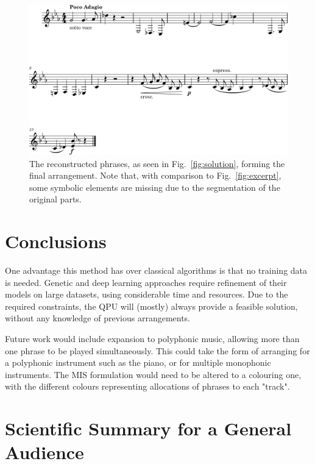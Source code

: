 \documentclass[aps,pra,10pt,twocolumn]{revtex4-2}
\begin{document}
\begin{figure}[h]
    \centering
    \includegraphics[width=\linewidth]{../Trials/1_arrangement.png}
    \caption{The reconstructed phrases, as seen in Fig.\ \ref{fig:solution}, forming the final arrangement. Note that, with comparison to Fig.\ \ref{fig:excerpt}, some symbolic elements are missing due to the segmentation of the original parts.}
    \label{fig:arrangement}
\end{figure}

\section{Conclusions}

One advantage this method has over classical algorithms is that no training data is needed. Genetic and deep learning approaches require refinement of their models on large datasets, using considerable time and resources. Due to the required constraints, the QPU will (mostly) always provide a feasible solution, without any knowledge of previous arrangements.

Future work would include expansion to polyphonic music, allowing more than one phrase to be played simultaneously. This could take the form of arranging for a polyphonic instrument such as the piano, or for multiple monophonic instruments. The MIS formulation would need to be altered to a colouring one, with the different colours representing allocations of phrases to each "track".

\nocite{*}


\clearpage

\onecolumngrid %

\section*{Scientific Summary for a General Audience}

\lipsum[1]
\end{document}
